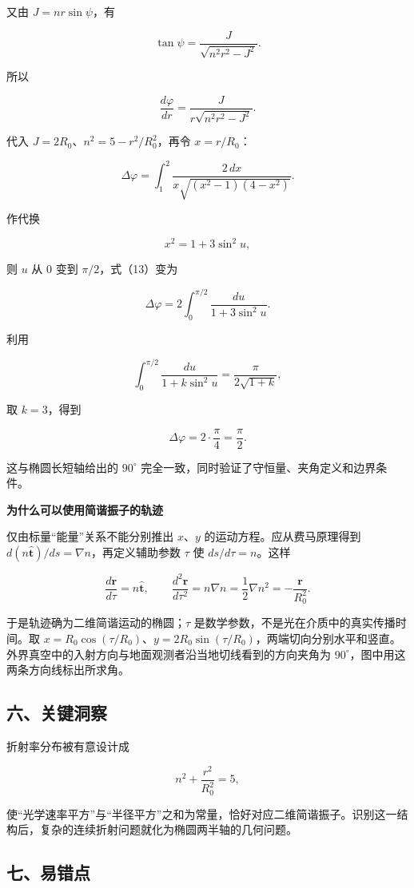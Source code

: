 \documentclass[12pt,a4paper,UTF8]{ctexart}
\begin{document}
又由 \(J=nr\sin\psi\)，有

\[
\tan\psi=\frac{J}{\sqrt{n^2r^2-J^2}}.
\]

所以

\[
\frac{d\varphi}{dr}
=\frac{J}{r\sqrt{n^2r^2-J^2}}.
\tag{12}
\]

代入 \(J=2R_0\)、\(n^2=5-r^2/R_0^2\)，再令 \(x=r/R_0\)：

\[
\Delta\varphi
=\int_1^2
\frac{2\,dx}{x\sqrt{(x^2-1)(4-x^2)}}.
\tag{13}
\]

作代换

\[
x^2=1+3\sin^2u,
\]

则 \(u\) 从 \(0\) 变到 \(\pi/2\)，式（13）变为

\[
\Delta\varphi
=2\int_0^{\pi/2}\frac{du}{1+3\sin^2u}.
\]

利用

\[
\int_0^{\pi/2}\frac{du}{1+k\sin^2u}
=\frac{\pi}{2\sqrt{1+k}},
\]

取 \(k=3\)，得到

\[
\Delta\varphi
=2\cdot\frac{\pi}{4}
=\frac\pi2.
\]

这与椭圆长短轴给出的 \(90^\circ\)
完全一致，同时验证了守恒量、夹角定义和边界条件。

\textbf{为什么可以使用简谐振子的轨迹}

仅由标量``能量''关系不能分别推出 \(x\)、\(y\)
的运动方程。应从费马原理得到
\(d(n\hat{\bm t})/ds=\nabla n\)，再定义辅助参数 \(\tau\) 使
\(ds/d\tau=n\)。这样

\[\frac{d\bm r}{d\tau}=n\hat{\bm t},\qquad \frac{d^2\bm r}{d\tau^2}=n\nabla n=\frac12\nabla n^2=-\frac{\bm r}{R_0^2}.\]

于是轨迹确为二维简谐运动的椭圆；\(\tau\)
是数学参数，不是光在介质中的真实传播时间。取
\(x=R_0\cos(\tau/R_0)\)、\(y=2R_0\sin(\tau/R_0)\)，两端切向分别水平和竖直。外界真空中的入射方向与地面观测者沿当地切线看到的方向夹角为
\(90^\circ\)，图中用这两条方向线标出所求角。

\subsection{六、关键洞察}\label{ux516dux5173ux952eux6d1eux5bdf-5}

折射率分布被有意设计成

\[
n^2+\frac{r^2}{R_0^2}=5,
\]

使``光学速率平方''与``半径平方''之和为常量，恰好对应二维简谐振子。识别这一结构后，复杂的连续折射问题就化为椭圆两半轴的几何问题。

\subsection{七、易错点}\label{ux4e03ux6613ux9519ux70b9-5}
\end{document}
